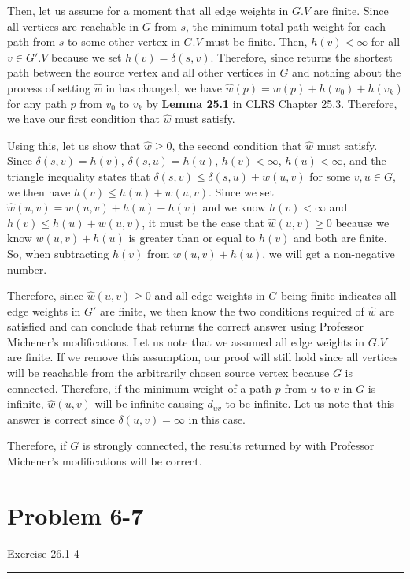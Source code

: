 \documentclass[11pt]{article}
\def\separateline{\medskip\hrule\medskip}
\begin{document}
Then, let us assume for a moment that all edge weights in $G.V$ are finite. Since all vertices are reachable in $G$ from $s$, the minimum total path weight for each path from $s$ to some other vertex in $G.V$ must be finite. Then, $h(v) < \infty$ for all $v \in G'.V$ because we set $h(v) = \delta(s,v)$. Therefore, since  returns the shortest path between the source vertex and all other vertices in $G$ and nothing about the process of setting $\hat{w}$ in  has changed, we have $\hat{w}(p) = w(p) + h(v_0) + h(v_k)$ for any path $p$ from $v_0$ to $v_k$ by \textbf{Lemma 25.1} in CLRS Chapter 25.3. Therefore, we have our first condition that $\hat{w}$ must satisfy.

Using this, let us show that $\hat{w} \geq 0$, the second condition that $\hat{w}$ must satisfy. Since $\delta(s,v) = h(v)$, $\delta(s,u) = h(u)$, $h(v) < \infty$, $h(u) < \infty$, and the triangle inequality states that $\delta(s,v) \leq \delta(s,u) + w(u,v)$ for some $v,u \in G$, we then have $h(v) \leq h(u) + w(u,v)$. Since we set $\hat{w}(u,v) = w(u,v) + h(u) - h(v)$ and we know $h(v) < \infty$ and $h(v) \leq h(u) + w(u,v)$, it must be the case that $\hat{w}(u,v) \geq 0$ because we know $w(u,v) + h(u)$ is greater than or equal to $h(v)$ and both are finite. So, when subtracting $h(v)$ from $w(u,v) + h(u)$, we will get a non-negative number.

Therefore, since $\hat{w}(u,v) \geq 0$ and all edge weights in $G$ being finite indicates all edge weights in $G'$ are finite, we then know the two conditions required of $\hat{w}$ are satisfied and can conclude that  returns the correct answer using Professor Michener's modifications. Let us note that we assumed all edge weights in $G.V$ are finite. If we remove this assumption, our proof will still hold since all vertices will be reachable from the arbitrarily chosen source vertex because $G$ is connected. Therefore, if the minimum weight of a path $p$ from $u$ to $v$ in $G$ is infinite, $\hat{w}(u,v)$ will be infinite causing $d_{uv}$ to be infinite. Let us note that this answer is correct since $\delta(u,v) = \infty$ in this case.

Therefore, if $G$ is strongly connected, the results returned by  with Professor Michener's modifications will be correct.

\newpage


\section{Problem 6-7}
Exercise 26.1-4
\separateline
\end{document}
